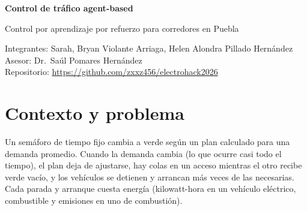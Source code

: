 \documentclass[11pt,letterpaper]{article}
\begin{document}
\begin{center}
  {\LARGE\bfseries Control de tráfico agent-based}\par
  \vspace{4pt}
  {\large Control por aprendizaje por refuerzo para corredores en Puebla}\par
  \vspace{12pt}
  {\small
  Integrantes: Sarah, Bryan Violante Arriaga, Helen Alondra Pillado Hernández\\
  Asesor: Dr.\ Saúl Pomares Hernández\\[2pt]
  Repositorio: \url{https://github.com/zxxz456/electrohack2026}}
\end{center}


\begin{abstract}
\noindent Los semáforos de Puebla operan casi todos con ciclos fijos, no responden a
la demanda real y provocan paradas y arranques innecesarios. Proponemos un
corredor de intersecciones semaforizadas alrededor de Ciudad Universitaria (BUAP)
en el que cada semáforo es controlado por un agente de aprendizaje por refuerzo.
Cada agente toma en cuenta el estado de las intersecciones de su entorno, que se
difunde de semáforo ($RSU$) en semáforo ($RSU$) como una onda causal difusa. 
De esa anticipación local se espera la emergencia de la coordinación del corredor 
sin un controlador central. 
El sistema optimiza a la vez el flujo
vehicular, el consumo de energia (kWh), consumo de energia (autos eléctricos), 
las emisiones del corredor, y el tiempo de cruce peatonal. Todo se evalua en 
simulación con SUMO sobre la red vial real,
completada con el inventario municipal de semáforos, y contra la operación actual
de tiempo fijo (baseline).
\end{abstract}

\section{Contexto y problema}

Un semáforo de tiempo fijo cambia a verde según un plan calculado para una
demanda promedio. Cuando la demanda cambia (lo que ocurre casi todo el tiempo), el
plan deja de ajustarse, hay colas en un acceso mientras el otro recibe verde
vacío, y los vehículos se detienen y arrancan más veces de las necesarias. Cada
parada y arranque cuesta energía (kilowatt-hora en un vehículo eléctrico,
combustible y emisiones en uno de combustión).
\end{document}
